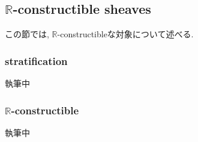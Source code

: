 \documentclass[../main]{subfiles}
\begin{document}
\setcounter{subsection}{2} \addtocounter{subsection}{-1}
\subsection{$\mathbb{R}$-constructible sheaves}
この節では, $\mathbb{R}$-constructibleな対象について述べる.
\subsubsection{stratification}
執筆中
\subsubsection{$\mathbb{R}$-constructible}
執筆中
\end{document}
